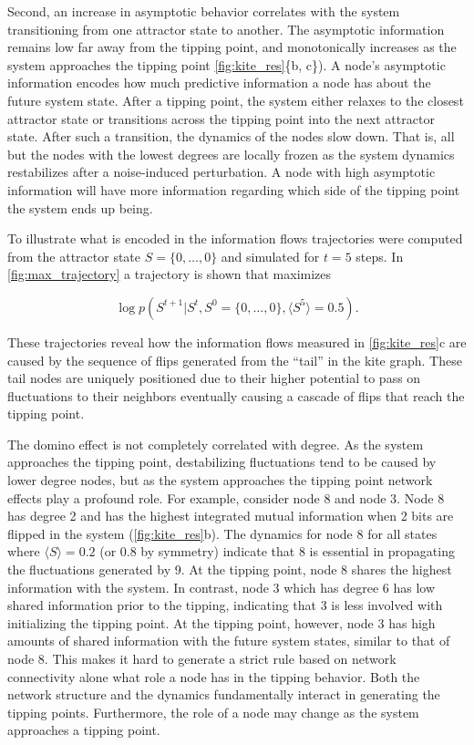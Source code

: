\documentclass[a4paper, 11pt, twocolumn]{article}
\begin{document}
Second, an  increase in asymptotic behavior  correlates with
the  system  transitioning  from   one  attractor  state  to
another.  The asymptotic  information remains  low far  away
from the  tipping point, and monotonically  increases as the
system approaches  the tipping  point \cref{fig:kite_res}\{b,
c\}).  A  node's  asymptotic  information  encodes  how  much
predictive information  a node  has about the  future system
state. After a  tipping point, the system  either relaxes to
the  closest  attractor  state  or  transitions  across  the
tipping point  into the next  attractor state. After  such a
transition, the  dynamics of the  nodes slow down.  That is,
all but the nodes with the lowest degrees are locally frozen
as the  system dynamics  restabilizes after  a noise-induced
perturbation. A  node with high asymptotic  information will
have more  information regarding  which side of  the tipping
point the system ends up being.

To  illustrate  what is  encoded  in  the information  flows
trajectories were  computed from  the attractor state  \(S =
\{0,  \dots,  0\}\)  and  simulated for  \(t=5\)  steps.  In
\cref{fig:max_trajectory}   a  trajectory   is  shown   that
maximizes

\begin{equation*}
\label{eq:max_trajectory}
\log p(S^{t + 1}|S^{t}, S^0 = \{0, \dots, 0\}, \langle S^5 \rangle = 0.5).
\end{equation*}

These trajectories reveal how the information flows measured
in  \cref{fig:kite_res}{c} are  caused  by  the sequence  of
flips generated  from the  ``tail'' in  the kite  graph. These
tail  nodes  are uniquely  positioned  due  to their  higher
potential  to  pass  on   fluctuations  to  their  neighbors
eventually causing a cascade of flips that reach the tipping
point.

The domino effect is  not completely correlated with degree.
As the  system approaches  the tipping  point, destabilizing
fluctuations tend to be caused by lower degree nodes, but as
the system approaches the tipping point network effects play
a profound  role. For example,  consider node 8 and  node 3.
Node 8  has degree 2  and has the highest  integrated mutual
information  when   2  bits   are  flipped  in   the  system
(\cref{fig:kite_res}{b}). The  dynamics for  node 8  for all
states where \(\langle  S \rangle = 0.2\) (or 0.8  by symmetry) indicate
that  8   is  essential  in  propagating   the  fluctuations
generated  by 9.  At the  tipping point,  node 8  shares the
highest  information with  the system.  In contrast,  node 3
which has degree  6 has low shared information  prior to the
tipping,   indicating  that   3   is   less  involved   with
initializing  the  tipping  point.  At  the  tipping  point,
however, node 3 has high  amounts of shared information with
the future  system states, similar  to that of node  8. This
makes it  hard to  generate a strict  rule based  on network
connectivity  alone what  role  a node  has  in the  tipping
behavior.  Both  the  network  structure  and  the  dynamics
fundamentally  interact in  generating  the tipping  points.
Furthermore, the  role of  a node may  change as  the system
approaches a tipping point.
\end{document}
